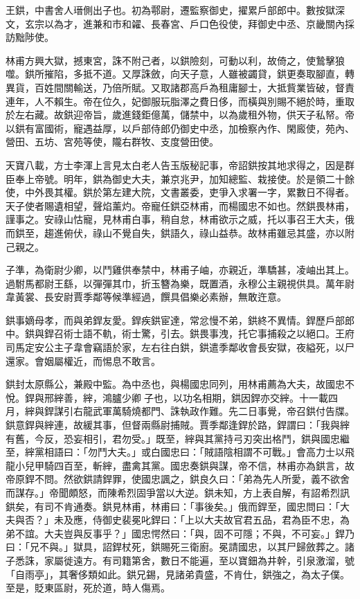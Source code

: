 \begin{pinyinscope}
 王鉷，中書舍人瑨側出子也。初為鄠尉，遷監察御史，擢累戶部郎中。數按獄深文，玄宗以為才，進兼和市和糴、長春宮、戶口色役使，拜御史中丞、京畿關內採訪黜陟使。



 林甫方興大獄，撼東宮，誅不附己者，以鉷險刻，可動以利，故倚之，使鷙擊狼噬。鉷所摧陷，多抵不道。又厚誅斂，向天子意，人雖被蠲貸，鉷更奏取腳直，轉異貨，百姓間關輸送，乃倍所賦。又取諸郡高戶為租庸腳士，大抵貲業皆破，督責連年，人不賴生。帝在位久，妃御服玩脂澤之費日侈，而橫與別賜不絕於時，重取於左右藏。故鉷迎帝旨，歲進錢鉅億萬，儲禁中，以為歲租外物，供天子私帑。帝以鉷有富國術，寵遇益厚，以戶部侍郎仍御史中丞，加檢察內作、閑廄使，苑內、營田、五坊、宮苑等使，隴右群牧、支度營田使。



 天寶八載，方士李渾上言見太白老人告玉版秘記事，帝詔鉷按其地求得之，因是群臣奉上帝號。明年，鉷為御史大夫，兼京兆尹，加知總監、栽接使。於是領二十餘使，中外畏其權。鉷於第左建大院，文書叢委，吏爭入求署一字，累數日不得者。天子使者賜遺相望，聲焰薰灼。帝寵任鉷亞林甫，而楊國忠不如也。然鉷畏林甫，謹事之。安祿山怙寵，見林甫白事，稍自怠，林甫欲示之威，托以事召王大夫，俄而鉷至，趨進俯伏，祿山不覺自失，鉷語久，祿山益恭。故林甫雖忌其盛，亦以附己親之。



 子準，為衛尉少卿，以鬥雞供奉禁中，林甫子岫，亦親近，準驕甚，凌岫出其上。過駙馬都尉王繇，以彈彈其巾，折玉簪為樂，既置酒，永穆公主親視供具。萬年尉韋黃裳、長安尉賈季鄰等候準經過，饌具倡樂必素辦，無敢迕意。



 鉷事嫡母孝，而與弟銲友愛。銲疾鉷宦達，常忿慢不弟，鉷終不異情。銲歷戶部郎中。鉷與銲召術士語不軌，術士驚，引去。鉷畏事洩，托它事捕殺之以絕口。王府司馬定安公主子韋會竊語於家，左右往白鉷，鉷遣季鄰收會長安獄，夜縊死，以尸還家。會姻屬權近，而惕息不敢言。



 鉷封太原縣公，兼殿中監。為中丞也，與楊國忠同列，用林甫薦為大夫，故國忠不悅。銲與邢縡善，縡，鴻臚少卿子也，以功名相期，鉷因銲亦交縡。十一載四月，縡與銲謀引右龍武軍萬騎燒都門、誅執政作難。先二日事覺，帝召鉷付告牒。鉷意銲與縡連，故緩其事，但督兩縣尉捕賊。賈季鄰逢銲於路，銲謂曰：「我與縡有舊，今反，恐妄相引，君勿受。」既至，縡與其黨持弓刃突出格鬥，鉷與國忠繼至，縡黨相語曰：「勿鬥大夫。」或白國忠曰：「賊語陰相謂不可戰。」會高力士以飛龍小兒甲騎四百至，斬縡，盡禽其黨。國忠奏鉷與謀，帝不信，林甫亦為鉷言，故帝原銲不問。然欲鉷請銲罪，使國忠諷之，鉷良久曰：「弟為先人所愛，義不欲舍而謀存。」帝聞頗怒，而陳希烈固爭當以大逆。鉷未知，方上表自解，有詔希烈訊鉷矣，有司不肯通奏。鉷見林甫，林甫曰：「事後矣。」俄而銲至，國忠問曰：「大夫與否？」未及應，侍御史裴冕叱銲曰：「上以大夫故官君五品，君為臣不忠，為弟不誼。大夫豈與反事乎？」國忠愕然曰：「與，固不可隱；不與，不可妄。」銲乃曰：「兄不與。」獄具，詔銲杖死，鉷賜死三衛廚。冕請國忠，以其尸歸斂葬之。諸子悉誅，家屬徙遠方。有司籍第舍，數日不能遍，至以寶鈿為井幹，引泉激溜，號「自雨亭」，其奢侈類如此。鉷兄錫，見諸弟貴盛，不肯仕，鉷強之，為太子僕。至是，貶東區尉，死於道，時人傷焉。




\end{pinyinscope}
